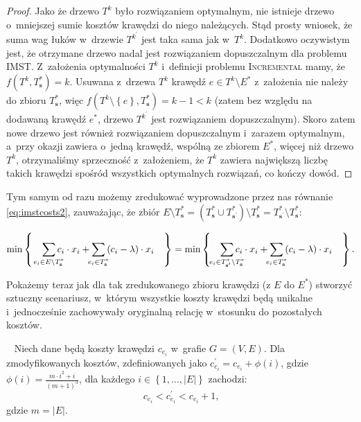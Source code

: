 \begin{proof}
	Jako że drzewo $T^{k}$ było rozwiązaniem optymalnym, nie istnieje drzewo o~mniejszej sumie kosztów krawędzi do niego należących. 
	Stąd prosty wniosek, że suma wag łuków w~drzewie $T^{k^{\prime}}$ jest taka sama jak w~$T^{k}$.
	Dodatkowo oczywistym jest, że otrzymane drzewo nadal jest rozwiązaniem dopuszczalnym dla problemu \textsc{IMST}.
	Z~założenia optymalności $T^{k}$ i~definicji problemu \textsc{Incremental} mamy, że $f \left( T^{k}, T^{\ast}_{\textbf{s}} \right) = k$.
	Usuwana z~drzewa $T^{k}$ krawędź $e \in T^{k} \setminus E^{\ast}$ z~założenia nie należy do zbioru $T^{\ast}_{\textbf{s}}$, więc $f \left( T^{k} \setminus \left\{ e \right\}, T^{\ast}_{\textbf{s}} \right) = k - 1 < k$ (zatem bez względu na dodawaną krawędź $e^{\ast}$, drzewo $T^{k^{\prime}}$ jest rozwiązaniem dopuszczalnym).
	Skoro zatem nowe drzewo jest również rozwiązaniem dopuszczalnym i~zarazem optymalnym, a~przy okazji zawiera o~jedną krawędź, wspólną ze zbiorem $E^{\ast}$, więcej niż drzewo $T^{k}$, otrzymaliśmy sprzeczność z~założeniem, że $T^{k}$ zawiera największą liczbę takich krawędzi spośród wszystkich optymalnych rozwiązań, co kończy dowód.
\end{proof}

Tym samym od razu możemy zredukować wyprowadzone przez nas równanie \ref{eq:imstcosts2}, zauważając, że zbiór $E \setminus T^{\ast}_{\textbf{s}} = \left( T^{\ast}_{\textbf{s}} \cup T^{\ast}_{\textbf{s}^{\prime}} \right) \setminus T^{\ast}_{\textbf{s}} = T^{\ast}_{\textbf{s}^{\prime}} \setminus T^{\ast}_{\textbf{s}}$:

\begin{equation}\label{eq:imstcosts3}
	\min \left\{ \quad \sum_{\mathclap{e_{i} \in E \setminus T^{\ast}_{\textbf{s}}}} c_{i} \cdot x_{i} + \sum_{\mathclap{e_{i} \in T^{\ast}_{\textbf{s}}}} \left( c_{i} - \lambda \right) \cdot x_{i} \quad \right\} = \min \left\{ \quad \sum_{\mathclap{e_{i} \in T^{\ast}_{\textbf{s}^{\prime}} \setminus T^{\ast}_{\textbf{s}}}} c_{i} \cdot x_{i} + \sum_{\mathclap{e_{i} \in T^{\ast}_{\textbf{s}}}} \left( c_{i} - \lambda \right) \cdot x_{i} \quad \right\}\text{.}
\end{equation}
	
Pokażemy teraz jak dla tak zredukowanego zbioru krawędzi (z $E$ do $E^{\ast}$) stworzyć sztuczny scenariusz, w~którym wszystkie koszty krawędzi będą unikalne i~jednocześnie zachowywały oryginalną relację w~stosunku do pozostałych kosztów.

\begin{lemma}~\cite{Dimitromanolakis02analysisof}\label{lm:Dimitromanolakis02analysisof}
	Niech dane będą koszty krawędzi $c_{e_{i}}$ w~grafie $G = \left( V, E \right)$.
	Dla zmodyfikowanych kosztów, zdefiniowanych jako $c^{\prime}_{e_{i}} = c_{e_{i}} + \phi \left( i \right)$, gdzie $\phi \left( i \right) = \frac{m \cdot i^{2} + i}{\left( m + 1 \right)^{3}}$, dla każdego $i \in \left\{ 1, \dots, \left| E \right| \right\}$ zachodzi:
	\begin{equation}\label{eq:Dimitromanolakis1}
		c_{e_{i}} < c^{\prime}_{e_{i}} < c_{e_{i}} + 1\text{,}
	\end{equation}
	gdzie $m = \left| E \right|$.
\end{lemma}

